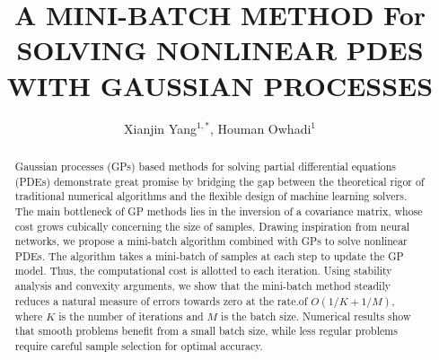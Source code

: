 \documentclass[10pt,reqno]{amsart}
\title[A MINI-BATCH METHOD For GAUSSIAN
PROCESS REGRESSION]{A MINI-BATCH METHOD For SOLVING NONLINEAR PDES WITH GAUSSIAN PROCESSES}
\author{Xianjin Yang$^{1,*}$, Houman Owhadi$^1$}
\newcommand{\1}{{\chi}}
\numberwithin{equation}{section}
\theoremstyle{thmlemcorr}
\numberwithin{theorem}{section}
\theoremstyle{thmlemcorr*}
\theoremstyle{defi}
\theoremstyle{remexample}
\theoremstyle{ass}
\begin{document}
\maketitle

\begin{abstract}
Gaussian processes (GPs) based methods for solving partial differential equations (PDEs)  demonstrate great promise by bridging the gap between the theoretical rigor of traditional numerical algorithms and the flexible design of machine learning solvers. The main bottleneck of GP methods lies in the inversion of a covariance matrix, whose cost grows cubically concerning the size of samples. Drawing inspiration from neural networks, we propose a mini-batch algorithm combined with GPs to solve nonlinear PDEs. The algorithm takes a mini-batch of samples at each step to update the GP model. Thus, the computational cost is allotted to each iteration. Using stability analysis and convexity arguments, we show that the mini-batch method steadily reduces a natural measure of errors towards zero at the rate.of $O(1/K+1/M)$, where $K$ is the number of iterations and $M$ is the batch size. Numerical results show that smooth problems benefit from a small batch size, while less regular problems require careful sample selection for optimal accuracy.
\end{abstract}
\end{document}
